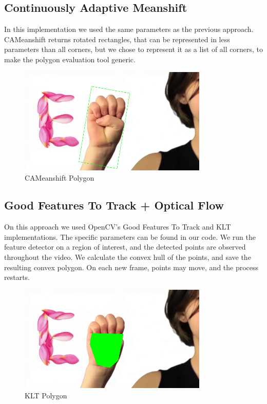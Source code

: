 \documentclass[a4paper]{article}
\begin{document}
\subsection{Continuously Adaptive Meanshift}
In this implementation we used the same parameters as the previous approach. CAMeanshift returns rotated rectangles, that can be represented in less parameters than all corners, but we chose to represent it as a list of all corners, to make the polygon evaluation tool generic.

\begin{figure}[ht!]
\centering
\includegraphics[width=90mm]{cam.png}
\caption{CAMeanshift Polygon}
\end{figure}

\subsection{Good Features To Track + Optical Flow}
On this approach we used OpenCV's Good Features To Track and KLT implementations. The specific parameters can be found in our code. We run the feature detector on a region of interest, and the detected points are observed throughout the video. We calculate the convex hull of the points, and save the resulting convex polygon. On each new frame, points may move, and the process restarts.

\begin{figure}[ht!]
\centering
\includegraphics[width=90mm]{klt.png}
\caption{KLT Polygon}
\end{figure}
\end{document}
